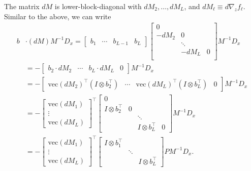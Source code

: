 \documentclass{article}
\begin{document}
The matrix $dM$ is lower-block-diagonal with $dM_2,\ldots, dM_L$, and $dM_\ell \equiv d \nabla_z f_\ell$. Similar to
the above, we can write
\begin{align}
    b & \cdot (dM) M^{-1} D_x =
    \begin{bmatrix}
        b_1 & \cdots & b_{L-1} & b_L
    \end{bmatrix}
    \begin{bmatrix}
        0                  \\
        -dM_2 & 0          \\
              & \ddots     \\
              & -dM_L  & 0 \\
    \end{bmatrix}
    M^{-1} D_x                                                                   \\
    & = -\begin{bmatrix}
        b_2 \cdot dM_2 & \cdots & b_L \cdot dM_L & 0
    \end{bmatrix}
    M^{-1} D_x                                                                   \\
    & = -\begin{bmatrix}
        \mathrm{vec} \left(dM_2\right)^\top \left(I \otimes b_2^\top\right) &
        \cdots                                                              &
        \mathrm{vec} \left(dM_L\right)^\top \left(I \otimes b_L^\top\right) &
        0
    \end{bmatrix}
    M^{-1} D_x                                                                   \\
    & =
    -\begin{bmatrix}
        \mathrm{vec} \left(dM_1\right) \\
        \vdots                         \\
        \mathrm{vec} \left(dM_L\right)
    \end{bmatrix}
    ^\top
    \begin{bmatrix}
        0                                               \\
        I \otimes b_2^\top & 0                          \\
                           &   & \ddots                 \\
                           &   & I \otimes b_L^\top & 0
    \end{bmatrix}
    M^{-1} D_x                                                                   \\
    & = -\begin{bmatrix}
        \mathrm{vec} \left(dM_1\right) \\
        \vdots                         \\
        \mathrm{vec} \left(dM_L\right)
    \end{bmatrix}
    ^\top
    \begin{bmatrix}
        I \otimes b_1^\top \\ &\ddots  \\ && I \otimes b_L^\top
    \end{bmatrix}
    PM^{-1} D_x.
\end{align}
\end{document}
